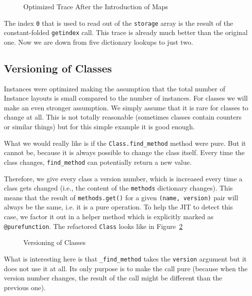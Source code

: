 \documentclass{sig-alternate}
\begin{document}
\begin{figure}

\caption{Optimized Trace After the Introduction of Maps}
\label{fig:trace3}
\end{figure}

The index \texttt{0} that is used to read out of the \texttt{storage} array is the result
of the constant-folded \texttt{getindex} call. This trace is already much better than
the original one. Now we are down from five dictionary lookups to just two.



\subsection{Versioning of Classes}

Instances were optimized making the assumption that the total number of
Instance layouts is small compared to the number of instances. For classes we
will make an even stronger assumption. We simply assume that it is rare for
classes to change at all. This is not totally reasonable (sometimes classes contain
counters or similar things) but for this simple example it is good enough.

What we would really like is if the \texttt{Class.find\_method} method were pure.
But it cannot be, because it is always possible to change the class itself.
Every time the class changes, \texttt{find\_method} can potentially return a
new value.

Therefore, we give every class a version number, which is increased every time a
class gets changed (i.e., the content of the \texttt{methods} dictionary changes).
This means that the result of \texttt{methods.get()} for a given \texttt{(name,
version)} pair will always be the same, i.e. it is a pure operation.  To help
the JIT to detect this case, we factor it out in a helper method which is
explicitly marked as \texttt{@purefunction}. The refactored \texttt{Class} looks like
in Figure~\ref{fig:version}

\begin{figure}

\caption{Versioning of Classes}
\label{fig:version}
\end{figure}

What is interesting here is that \texttt{\_find\_method} takes the \texttt{version}
argument but it does not use it at all. Its only purpose is to make the call
pure (because when the version number changes, the result of the call might be
different than the previous one).
\end{document}
